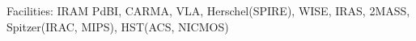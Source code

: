 \documentclass[]{emulateapj}
\begin{document}
Facilities: IRAM PdBI, CARMA, VLA, Herschel(SPIRE), WISE, IRAS, 2MASS, Spitzer(IRAC, MIPS), HST(ACS, NICMOS)




\end{document}
